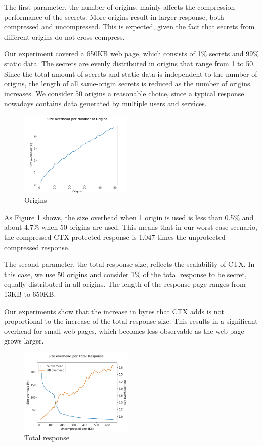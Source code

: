 The first parameter, the number of origins, mainly affects the compression
performance of the secrets. More origins result in larger response, both
compressed and uncompressed. This is expected, given the fact that secrets from
different origins do not cross-compress.

Our experiment covered a 650KB web page, which consists of 1\% secrets and 99\%
static data. The secrets are evenly distributed in origins that range from 1 to
50. Since the total amount of secrets and static data is independent to the
number of origins, the length of all same-origin secrets is reduced as the
number of origins increases. We consider 50 origins a reasonable choice, since a
typical response nowadays contains data generated by multiple users and
services.

    \begin{figure}[thpb]
        \centering
            \includegraphics[width=0.48\textwidth]{experiments/ctx_performance/origins.png}
        \caption{Origins}
        \label{fig:origin_ctx}
    \end{figure}

As Figure \ref{fig:origin_ctx} shows, the size overhead when 1 origin is used is
less than 0.5\% and about 4.7\% when 50 origins are used. This means that in our
worst-case scenario, the compressed CTX-protected response is 1.047 times the
unprotected compressed response.

The second parameter, the total response size, reflects the scalability of CTX.
In this case, we use 50 origins and consider 1\% of the total response to be
secret, equally distributed in all origins. The length of the response page
ranges from 13KB to 650KB.

Our experiments show that the increase in bytes that CTX adds is not
proportional to the increase of the total response size. This results in a
significant overhead for small web pages, which becomes less observable as the
web page grows larger.

    \begin{figure}[thpb]
        \centering
            \includegraphics[width=0.48\textwidth]{experiments/ctx_performance/total_response.png}
        \caption{Total response}
        \label{fig:total_response_ctx}
    \end{figure}

